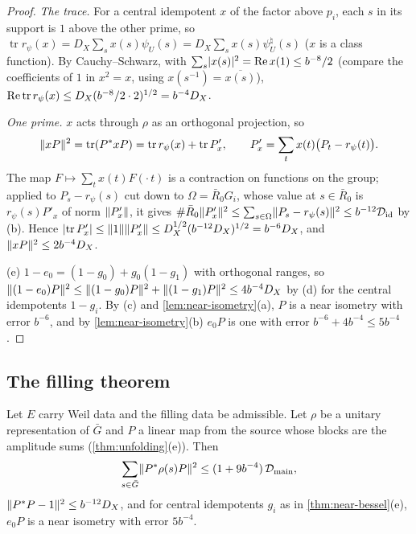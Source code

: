 \begin{proof}
\emph{The trace.} For a central idempotent $x$ of the factor above $p_i$, each $s$ in its support is $1$ above the other prime, so $\operatorname{tr}r_\psi(x)=D_X\sum_sx(s)\psi_U(s)=D_X\sum_sx(s)\psi^\natural_U(s)$ ($x$ is a class function). By Cauchy--Schwarz, with $\sum_s\lvert x(s)\rvert^2=\operatorname{Re} x(1)\le b^{-8}/2$ (compare the
coefficients of $1$ in $x^2=x$, using $x(s^{-1})=\overline{x(s)}$), $\operatorname{Re}\operatorname{tr}r_\psi(x)\le D_X(b^{-8}/2\cdot2)^{1/2}=b^{-4}D_X$.

\emph{One prime.} $x$ acts through $\rho$ as an orthogonal projection, so
\[
  \lVert xP\rVert^2=\operatorname{tr}(P^*xP)=\operatorname{tr}r_\psi(x)+\operatorname{tr}P'_x,\qquad P'_x=\sum_tx(t)\bigl(P_t-r_\psi(t)\bigr).
\] The map $F\mapsto\sum_tx(t)F(\cdot\,t)$ is a contraction on functions on the group; applied to $P_s-r_\psi(s)$ cut down to
$\Omega=\bar R_0G_i$, whose value at $s\in\bar R_0$ is $r_\psi(s)P'_x$ of norm $\lVert P'_x\rVert$, it gives $\#\bar R_0\lVert P'_x\rVert^2\le\sum_{s\in\Omega}\lVert P_s-r_\psi(s)\rVert^2\le b^{-12}\mathcal D_{\rm id}$ by (b). Hence $\lvert \operatorname{tr}P'_x\rvert\le\lVert 1\rVert\lVert P'_x\rVert\le D_X^{1/2}(b^{-12}D_X)^{1/2}=b^{-6}D_X$, and $\lVert xP\rVert^2\le2b^{-4}D_X$.

(e) $1-e_0=(1-g_0)+g_0(1-g_1)$ with orthogonal ranges, so $\lVert (1-e_0)P\rVert^2\le\lVert (1-g_0)P\rVert^2+\lVert (1-g_1)P\rVert^2\le4b^{-4}D_X$ by (d) for the central idempotents $1-g_i$. By (c) and \cref{lem:near-isometry}(a), $P$ is a near isometry with error $b^{-6}$, and by
\cref{lem:near-isometry}(b) $e_0P$ is one with error $b^{-6}+4b^{-4}\le5b^{-4}$.
\end{proof}

\subsection{The filling theorem}\label{ss:filling-theorem}

\begin{theorem}\label{thm:filling}
Let $E$ carry Weil data and the filling data be admissible. Let $\rho$ be a unitary representation of $\bar G$ and $P$ a linear map from the source whose blocks are the amplitude sums
(\cref{thm:unfolding}(e)). Then
\[
  \sum_{s\in\bar G}\lVert P^*\rho(s)P\rVert^2\le(1+9b^{-4})\,\mathcal D_{\rm main},
\]
$\lVert P^*P-1\rVert^2\le b^{-12}D_X$, and for central idempotents $g_i$ as in \cref{thm:near-bessel}(e), $e_0P$ is a near isometry with error $5b^{-4}$.
\end{theorem}

